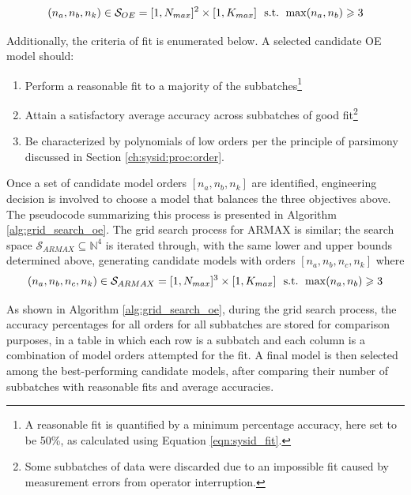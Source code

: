 \begin{equation*}
    (n_a, n_b, n_k)\in \mathcal{S}_{OE} = [1, N_{max}]^2 \times [1, K_{max}] \text{\space\space s.t. } \max(n_a, n_b) \geqslant 3
    \label{eqn:oe_bounds}
\end{equation*}

Additionally, the criteria of fit is enumerated below. A selected candidate OE model should: 

\begin{enumerate}
    \item Perform a reasonable fit to a majority of the subbatches\footnote{A reasonable fit is quantified by a minimum percentage accuracy, here set to be 50\%, as calculated using Equation \ref{eqn:sysid_fit}.\label{ftn:good}}
    \item Attain a satisfactory average accuracy across subbatches of good fit\footnote{Some subbatches of data were discarded due to an impossible fit caused by measurement errors from operator interruption.}
    \item Be characterized by polynomials of low orders per the principle of parsimony discussed in Section \ref{ch:sysid:proc:order}.
\end{enumerate}

Once a set of candidate model orders $[n_a, n_b, n_k]$ are identified, engineering decision is involved to choose a model that balances the three objectives above. The pseudocode summarizing this process is presented in Algorithm \ref{alg:grid_search_oe}. The grid search process for ARMAX is similar; the search space $\mathcal{S}_{ARMAX} \subseteq \mathbb{N}^4$ is iterated through, with the same lower and upper bounds determined above, generating candidate models with orders $[n_a, n_b, n_c, n_k]$ where
\begin{equation*}
    (n_a, n_b, n_c, n_k)\in \mathcal{S}_{ARMAX} = [1, N_{max}]^3 \times [1, K_{max}] \text{\space\space s.t. } \max(n_a, n_b) \geqslant 3
    \label{eqn:armax_bounds}
\end{equation*}

As shown in Algorithm \ref{alg:grid_search_oe}, during the grid search process, the accuracy percentages for all orders for all subbatches are stored for comparison purposes, in a table in which each row is a subbatch and each column is a combination of model orders attempted for the fit. A final model is then selected among the best-performing candidate models, after comparing their number of subbatches with reasonable fits and average accuracies. 

